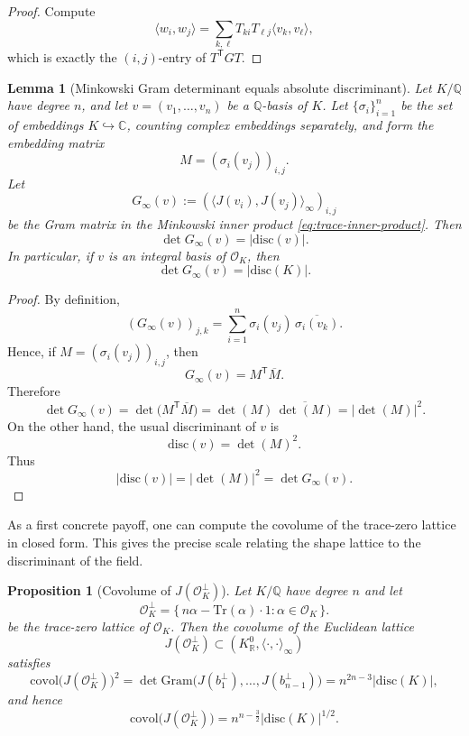 \documentclass[11pt,letterpaper]{amsart}
\newcommand{\Q}{\mathbb{Q}}
\newcommand{\R}{\mathbb{R}}
\newcommand{\C}{\mathbb{C}}
\newcommand{\cO}{\mathcal{O}}
\newcommand{\Tr}{\mathrm{Tr}}
\newcommand{\disc}{\mathrm{disc}}
\theoremstyle{plain}
\newtheorem{proposition}[theorem]{Proposition}
\newtheorem{lemma}[theorem]{Lemma}
\theoremstyle{definition}
\begin{document}
\begin{proof}
Compute
\[
\langle w_i,w_j\rangle=\sum_{k,\ell}T_{ki}T_{\ell j}\langle v_k,v_\ell\rangle,
\]
which is exactly the $(i,j)$-entry of $T^{\mathsf T}GT$.
\end{proof}

\begin{lemma}[Minkowski Gram determinant equals absolute discriminant]\label{lem:gram-absdisc}
Let $K/\Q$ have degree $n$, and let $v=(v_1,\dots,v_n)$ be a $\Q$-basis of $K$.
Let $\{\sigma_i\}_{i=1}^n$ be the set of embeddings $K\hookrightarrow\C$, counting complex embeddings separately,
and form the embedding matrix
\[
M=(\sigma_i(v_j))_{i,j}.
\]
Let
\[
G_\infty(v):=(\langle J(v_i),J(v_j)\rangle_\infty)_{i,j}
\]
be the Gram matrix in the Minkowski inner product \eqref{eq:trace-inner-product}.
Then
\[
\det G_\infty(v)=|\disc(v)|.
\]
In particular, if $v$ is an integral basis of $\cO_K$, then
\[
\det G_\infty(v)=|\disc(K)|.
\]
\end{lemma}

\begin{proof}
By definition,
\[
(G_\infty(v))_{j,k}
=\sum_{i=1}^n \sigma_i(v_j)\,\overline{\sigma_i(v_k)}.
\]
Hence, if \(M=(\sigma_i(v_j))_{i,j}\), then
\[
G_\infty(v)=M^{\mathsf T}\overline{M}.
\]
Therefore
\[
\det G_\infty(v)
=\det\!\bigl(M^{\mathsf T}\overline{M}\bigr)
=\det(M)\,\overline{\det(M)}
=|\det(M)|^2.
\]
On the other hand, the usual discriminant of \(v\) is
\[
\disc(v)=\det(M)^2.
\]
Thus
\[
|\disc(v)|=|\det(M)|^2=\det G_\infty(v).
\]
\end{proof}

As a first concrete payoff, one can compute the covolume of the trace-zero lattice in closed form. This gives the precise scale relating the shape lattice to the discriminant of the field.

\begin{proposition}[Covolume of $J(\cO_K^\perp)$]\label{prop:covolume-tracezero}
Let $K/\Q$ have degree $n$ and let
\[
\cO_K^\perp=\{\,n\alpha-\Tr(\alpha)\cdot 1:\alpha\in \cO_K\,\}.
\]
be the trace-zero lattice of $\cO_K$.
Then the covolume of the Euclidean lattice
\[
J(\cO_K^\perp)\subset (K_\R^0,\langle\cdot,\cdot\rangle_\infty)
\]
satisfies
\[
\mathrm{covol}\bigl(J(\cO_K^\perp)\bigr)^2
=\det\mathrm{Gram}\bigl(J(b_1^\perp),\dots,J(b_{n-1}^\perp)\bigr)
= n^{2n-3}|\disc(K)|,
\]
and hence
\[
\mathrm{covol}\bigl(J(\cO_K^\perp)\bigr)=n^{n-\frac32}|\disc(K)|^{1/2}.
\]
\end{proposition}
\end{document}
